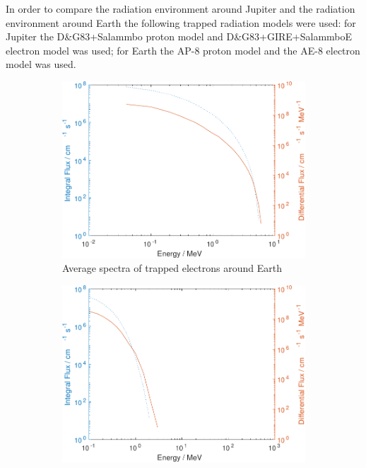 \label{subsec:AppendixRadiationEnvironment}

In order to compare the radiation environment around Jupiter and the radiation environment around Earth the following trapped radiation models were used: for Jupiter the D\&G83+Salammbo proton model and D\&G83+GIRE+SalammboE electron model was used; for Earth the AP-8 proton model and the AE-8 electron model was used.

\begin{figure}[htb]
     \centering
     \begin{subfigure}[b]{0.49\textwidth}
         \centering
         \includegraphics[width=\textwidth]{Media/E_Electron_Flux}
         \caption{Average spectra of trapped electrons around Earth}
         \label{fig:trappedelectronsEarth}
     \end{subfigure}
     \hfill
     \begin{subfigure}[b]{0.49\textwidth}
         \centering
         \includegraphics[width=\textwidth]{Media/E_Proton_Flux}

\end{subfigure}
\end{figure}

